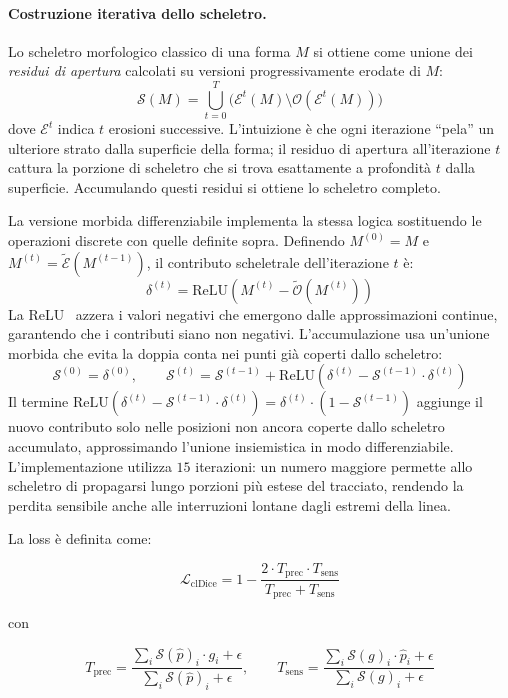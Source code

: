 \paragraph{Costruzione iterativa dello scheletro.}
Lo scheletro morfologico classico di una forma $M$ si ottiene come unione dei \textit{residui di apertura} calcolati su versioni progressivamente erodate di $M$:
\[
    \mathcal{S}(M) = \bigcup_{t=0}^{T} \bigl(\mathcal{E}^t(M) \setminus \mathcal{O}(\mathcal{E}^t(M))\bigr)
\]
dove $\mathcal{E}^t$ indica $t$ erosioni successive. L'intuizione è che ogni iterazione ``pela'' un ulteriore strato dalla superficie della forma; il residuo di apertura all'iterazione $t$ cattura la porzione di scheletro che si trova esattamente a profondità $t$ dalla superficie. Accumulando questi residui si ottiene lo scheletro completo.

La versione morbida differenziabile implementa la stessa logica sostituendo le operazioni discrete con quelle definite sopra. Definendo $M^{(0)} = M$ e $M^{(t)} = \widetilde{\mathcal{E}}(M^{(t-1)})$, il contributo scheletrale dell'iterazione $t$ è:
\[
    \delta^{(t)} = \mathrm{ReLU}\!\left(M^{(t)} - \widetilde{\mathcal{O}}(M^{(t)})\right)
\]
La ReLU~\cite{nair2010relu} azzera i valori negativi che emergono dalle approssimazioni continue, garantendo che i contributi siano non negativi. L'accumulazione usa un'unione morbida che evita la doppia conta nei punti già coperti dallo scheletro:
\[
    \mathcal{S}^{(0)} = \delta^{(0)}, \qquad
    \mathcal{S}^{(t)} = \mathcal{S}^{(t-1)} + \mathrm{ReLU}\!\left(\delta^{(t)} - \mathcal{S}^{(t-1)} \cdot \delta^{(t)}\right)
\]
Il termine $\mathrm{ReLU}(\delta^{(t)} - \mathcal{S}^{(t-1)} \cdot \delta^{(t)}) = \delta^{(t)} \cdot (1 - \mathcal{S}^{(t-1)})$ aggiunge il nuovo contributo solo nelle posizioni non ancora coperte dallo scheletro accumulato, approssimando l'unione insiemistica in modo differenziabile. L'implementazione utilizza $15$ iterazioni: un numero maggiore permette allo scheletro di propagarsi lungo porzioni più estese del tracciato, rendendo la perdita sensibile anche alle interruzioni lontane dagli estremi della linea.

La loss è definita come:

\[
    \mathcal{L}_{\text{clDice}} = 1 - \frac{2 \cdot T_{\text{prec}} \cdot T_{\text{sens}}}{T_{\text{prec}} + T_{\text{sens}}}
\]

con

\[
    T_{\text{prec}} = \frac{\sum_i \mathcal{S}(\hat{p})_i \cdot g_i + \epsilon}{\sum_i \mathcal{S}(\hat{p})_i + \epsilon}, \qquad
    T_{\text{sens}} = \frac{\sum_i \mathcal{S}(g)_i \cdot \hat{p}_i + \epsilon}{\sum_i \mathcal{S}(g)_i + \epsilon}
\]

